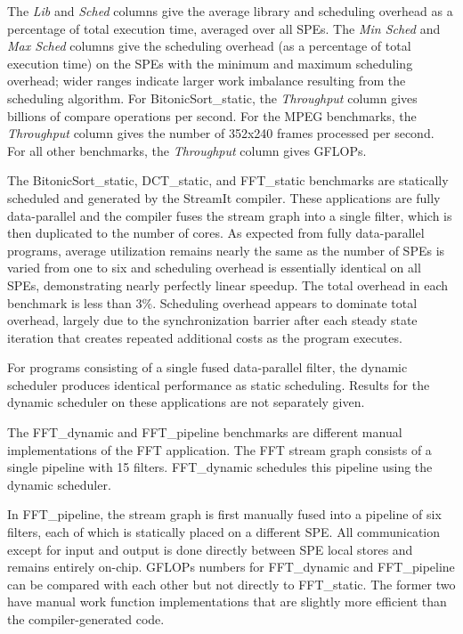 The \emph{Lib} and \emph{Sched} columns give the average library and scheduling overhead
as a percentage of total execution time, averaged over all SPEs.
The \emph{Min Sched} and \emph{Max Sched} columns give the scheduling overhead
(as a percentage of total execution time) on the SPEs with the minimum and maximum
scheduling overhead; wider ranges indicate larger work imbalance
resulting from the scheduling algorithm.
For \textsf{BitonicSort\_static}, the \emph{Throughput} column gives
billions of compare operations per second. For the MPEG benchmarks,
the \emph{Throughput} column gives the number of 352x240 frames processed per second.
For all other benchmarks, the \emph{Throughput} column gives GFLOPs.

The \textsf{BitonicSort\_static}, \textsf{DCT\_static}, and \textsf{FFT\_static} benchmarks
are statically scheduled and generated by the StreamIt compiler.
These applications are fully data-parallel and the compiler fuses the stream graph
into a single filter, which is then duplicated to the number of cores.
As expected from fully data-parallel programs, average utilization remains nearly the same
as the number of SPEs is varied from one to six and scheduling overhead is essentially identical
on all SPEs, demonstrating nearly perfectly linear speedup.
The total overhead in each benchmark is less than 3\%. Scheduling overhead appears
to dominate total overhead, largely due to the synchronization barrier after each steady state
iteration that creates repeated additional costs as the program executes.

For programs consisting of a single fused data-parallel filter, the dynamic scheduler produces identical performance as static scheduling. Results for the dynamic scheduler on these applications are not separately given.

The \textsf{FFT\_dynamic} and \textsf{FFT\_pipeline} benchmarks are different manual implementations of the FFT application. The FFT stream graph consists of a single pipeline with 15 filters. \textsf{FFT\_dynamic} schedules this pipeline using the dynamic scheduler. 

In \textsf{FFT\_pipeline}, the stream graph is first manually fused into a pipeline of six filters, each of which is statically placed on a different SPE. All communication except for input and output is done directly between SPE local stores and remains entirely on-chip. GFLOPs numbers for \textsf{FFT\_dynamic} and \textsf{FFT\_pipeline} can be compared with each other but not directly to \textsf{FFT\_static}.
The former two have manual work function implementations that are slightly more efficient than the compiler-generated code.

